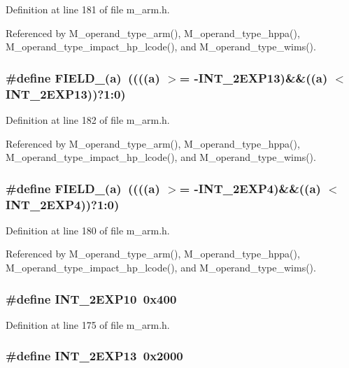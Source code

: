 Definition at line 181 of file m\_\-arm.h.

Referenced by M\_\-operand\_\-type\_\-arm(), M\_\-operand\_\-type\_\-hppa(), M\_\-operand\_\-type\_\-impact\_\-hp\_\-lcode(), and M\_\-operand\_\-type\_\-wims().
\subsubsection{\setlength{\rightskip}{0pt plus 5cm}\#define FIELD\_(a)~((((a) $>$= -INT\_\-2EXP13)\&\&((a) $<$ INT\_\-2EXP13))?1:0)}\label{m__arm_8h_cc6a0eb7724b0802cbd69ae9acf6082b}




Definition at line 182 of file m\_\-arm.h.

Referenced by M\_\-operand\_\-type\_\-arm(), M\_\-operand\_\-type\_\-hppa(), M\_\-operand\_\-type\_\-impact\_\-hp\_\-lcode(), and M\_\-operand\_\-type\_\-wims().
\subsubsection{\setlength{\rightskip}{0pt plus 5cm}\#define FIELD\_(a)~((((a) $>$= -INT\_\-2EXP4)\&\&((a) $<$ INT\_\-2EXP4))?1:0)}\label{m__arm_8h_fccd4f0351ce74077ec3a4453fc78a78}




Definition at line 180 of file m\_\-arm.h.

Referenced by M\_\-operand\_\-type\_\-arm(), M\_\-operand\_\-type\_\-hppa(), M\_\-operand\_\-type\_\-impact\_\-hp\_\-lcode(), and M\_\-operand\_\-type\_\-wims().
\subsubsection{\setlength{\rightskip}{0pt plus 5cm}\#define INT\_\-2EXP10~0x400}\label{m__arm_8h_651faa72c9b7f15c045f3331409244fd}




Definition at line 175 of file m\_\-arm.h.
\subsubsection{\setlength{\rightskip}{0pt plus 5cm}\#define INT\_\-2EXP13~0x2000}\label{m__arm_8h_d54f85a1243ada4cb7c81d57efa1e094}




